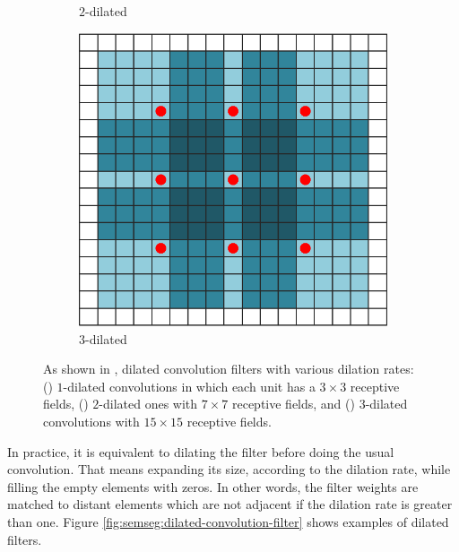 \begin{figure}[!hbt]
\begin{subfigure}{0.30\linewidth}
		\caption{$2$-dilated}
		\label{fig:dilated-convolution:2}
	\end{subfigure}
	\hfill
	\begin{subfigure}{0.30\linewidth}
		\includegraphics[width=\linewidth]{Figures/Segmentation/dilated_conv3_rework.eps}
		\caption{$3$-dilated}
		\label{fig:dilated-convolution:3}
	\end{subfigure}
	\hfill
	\caption{As shown in \cite{Yu2015}, dilated convolution filters with various dilation rates: (\protect{}) $1$-dilated convolutions in which each unit has a $3\times3$ receptive fields, (\protect{}) $2$-dilated ones with $7\times7$ receptive fields, and (\protect{}) $3$-dilated convolutions with $15\times15$ receptive fields.}
	\label{fig:semseg:dilated-convolution}
\end{figure}

In practice, it is equivalent to dilating the filter before doing the usual convolution. That means expanding its size, according to the dilation rate, while filling the empty elements with zeros. In other words, the filter weights are matched to distant elements which are not adjacent if the dilation rate is greater than one. Figure \ref{fig:semseg:dilated-convolution-filter} shows examples of dilated filters.

